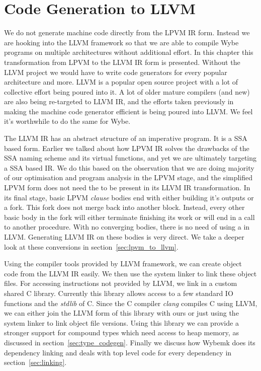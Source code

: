 \chapter{Code Generation to LLVM}
\label{chap:codegen_llvm}

We do not generate machine code directly from the LPVM IR form. Instead we are
hooking into the LLVM framework \citep{Lattner:MSThesis02} so that we are able
to compile Wybe programs on multiple architectures without additional
effort. In this chapter this transformation from LPVM to the LLVM IR form is
presented. Without the LLVM project we would have to write code generators for
every popular architecture and more. LLVM is a popular open source project with
a lot of collective effort being poured into it. A lot of older mature
compilers (and new) are also being re-targeted to LLVM IR, and the efforts
taken previously in making the machine code generator efficient is being poured
into LLVM. We feel it's worthwhile to do the same for Wybe.

The LLVM IR has an abstract structure of an imperative program. It is a SSA
based form. Earlier we talked about how LPVM IR solves the drawbacks of the SSA
naming scheme and its virtual functions, and yet we are ultimately targeting a
SSA based IR. We do this based on the observation that we are doing majority of
our optimisation and program analysis in the LPVM stage, and the simplified
LPVM form does not need the \phif to be present in its LLVM IR
transformation. In its final stage, basic LPVM \textit{clause} bodies end with
either building it's outputs or a fork. This fork does not merge back into
another block. Instead, every other basic body in the fork will either
terminate finishing its work or will end in a call to another procedure. With
no converging bodies, there is no need of using a \phif in LLVM. Generating
LLVM IR on these bodies is very direct. We take a deeper look at these
conversions in section~\ref{sec:lpvm_to_llvm}.

Using the compiler tools provided by LLVM framework, we can create object code
from the LLVM IR easily. We then use the system linker to link these object
files. For accessing instructions not provided by LLVM, we link in a custom
shared C library. Currently this library allows access to a few standard IO
functions and the \textit{stdlib} of C. Since the C compiler \textit{clang}
compiles C using LLVM, we can either join the LLVM form of this library with
ours or just using the system linker to link object file versions. Using this
library we can provide a stronger support for compound types which need access
to heap memory, as discussed in section~\ref{sec:type_codegen}. Finally we
discuss how Wybemk does its dependency linking and deals with top level code
for every dependency in section~\ref{sec:linking}.


